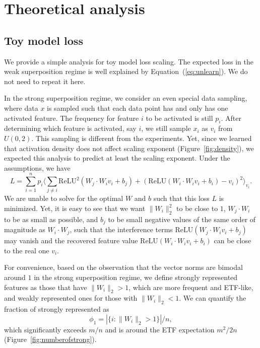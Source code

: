 \documentclass{article}
\begin{document}
\begin{enumerate}
\end{enumerate}


\newpage
\appendix

\section{Theoretical analysis}

\subsection{Toy model loss}\label{app:losstheory}

We provide a simple analysis for toy model loss scaling. The expected loss in the weak superposition regime is well explained by Equation~(\ref{eq:unlearn}). We do not need to repeat it here.

In the strong superposition regime, we consider an even special data sampling, where data $x$ is sampled such that each data point has and only has one activated feature. The frequency for feature $i$ to be activated is still $p_i$. After determining which feature is activated, say $i$, we still sample $x_i$ as $v_i$ from $U(0,2)$. This sampling is different from the experiments. Yet, since we learned that activation density does not affect scaling exponent (Figure~\ref{fig:density}), we expected this analysis to predict at least the scaling exponent. Under the assumptions, we have
\begin{equation}
    L = \sum_{i=1}^n p_i \Big\langle \sum_{j\neq i} \mathrm{ReLU}^2(W_j\cdot W_i v_i + b_j) + (\mathrm{ReLU}(W_i\cdot W_i v_i + b_i) - v_i)^2\Big\rangle_{v_i}.
    \label{eq:strongloss}
\end{equation}
We are unable to solve for the optimal $W$ and $b$ such that this loss $L$ is minimized. Yet, it is easy to see that we want $\|W_i\|_2^2$ to be close to $1$, $W_j\cdot W_i$ to be as small as possible, and $b_j$ to be small negative values of the same order of magnitude as $W_i \cdot W_j$, such that the interference terms $\mathrm{ReLU}(W_j\cdot W_i v_i + b_j)$ may vanish and the recovered feature value $\mathrm{ReLU}(W_i\cdot W_i v_i + b_i)$ can be close to the real one $v_i$.

For convenience, based on the observation that the vector norms are bimodal around $1$ in the strong superposition regime, we define strongly represented features as those that have $\|W_i\|_2 > 1$, which are more frequent and ETF-like, and weakly represented ones for those with $\|W_i\|_2 < 1$. We can quantify the fraction of strongly represented as
\begin{equation}
    \phi_1 = |\{ i : \|W_i \|_2 > 1 \}| / n,
\end{equation}
which significantly exceeds $m/n$ and is around the ETF expectation $m^2 / 2n$ (Figure~\ref{fig:numberofstrong}).
\end{document}
